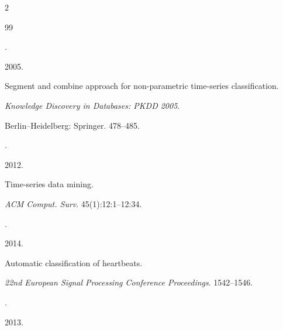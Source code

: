   \begin{multicols}{2}





\renewcommand{\bibname}{\protect\rmfamily References}







{\small\frenchspacing


 {%




 \begin{thebibliography}{99}







.


2005.


 Segment and combine approach for non-parametric time-series classification.


\textit{Knowledge Discovery in Databases: PKDD 2005}. 


Berlin--Heidelberg: Springer. 478--485.







.


2012.


Time-series data mining.


\textit{ACM Comput. Surv}. 45(1):12:1--12:34.







.


2014.


Automatic classification of heartbeats.


\textit{22nd European Signal Processing Conference Proceedings}. 1542--1546.







.


2013.



\end{thebibliography}}}
\end{multicols}
